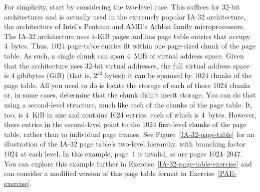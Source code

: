 For simplicity, start by considering the two-level case.  This suffices
for 32-bit architectures and is actually used in the extremely
popular IA-32 architecture, the architecture of Intel's Pentium and
AMD's Athlon family microprocessors.  The IA-32 architecture uses 4-KiB
pages and has page table entries that occupy 4~bytes.  Thus, 1024
page-table entries fit within one page-sized chunk of the page table.
As such, a single chunk can span 4~MiB of virtual address space.  Given
that the architecture uses 32-bit virtual addresses, the full virtual address space
is 4 gibibytes (GiB) (that is, $2^{32}$ bytes); it can be spanned by 1024 chunks of the
page table.  All you need to do is locate the storage of each of those
1024 chunks or, in some cases, determine that the chunk didn't merit
storage.  You can do that using a second-level structure, much like
each of the chunks of the page table.  It, too, is 4~KiB in size and
contains 1024 entries, each of which is 4~bytes.  However, these entries in
the second-level  point to the 1024 first-level
chunks of the page table, rather than to individual page frames.  See
Figure~\ref{IA-32-page-table} for an illustration of the
IA-32 page table's  two-level hierarchy, with
branching factor 1024 at each level.  In this example, page~1
is invalid, as are pages 1024--2047.  You can explore this
example further in Exercise~\ref{IA-32-page-table-exercise} and can
consider a modified version of this page table format in Exercise~\ref{PAE-exercise}.
